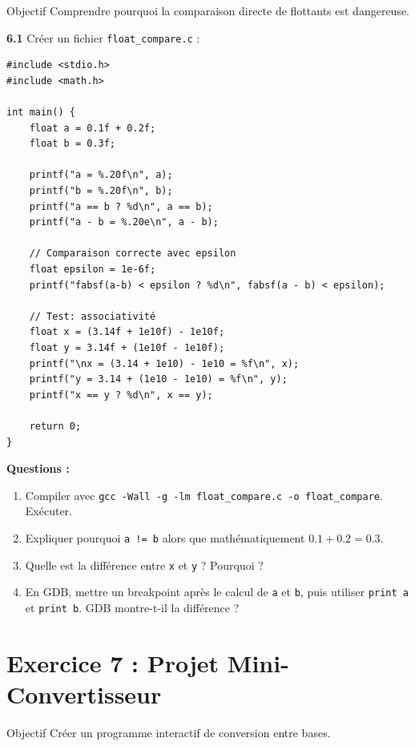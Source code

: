 \documentclass[10pt,a4paper]{article}
\begin{document}
\begin{exercicebox}{Objectif}
Comprendre pourquoi la comparaison directe de flottants est dangereuse.
\end{exercicebox}

\textbf{6.1} Créer un fichier \texttt{float\_compare.c} :

\begin{lstlisting}
#include <stdio.h>
#include <math.h>

int main() {
    float a = 0.1f + 0.2f;
    float b = 0.3f;
    
    printf("a = %.20f\n", a);
    printf("b = %.20f\n", b);
    printf("a == b ? %d\n", a == b);
    printf("a - b = %.20e\n", a - b);
    
    // Comparaison correcte avec epsilon
    float epsilon = 1e-6f;
    printf("fabsf(a-b) < epsilon ? %d\n", fabsf(a - b) < epsilon);
    
    // Test: associativité
    float x = (3.14f + 1e10f) - 1e10f;
    float y = 3.14f + (1e10f - 1e10f);
    printf("\nx = (3.14 + 1e10) - 1e10 = %f\n", x);
    printf("y = 3.14 + (1e10 - 1e10) = %f\n", y);
    printf("x == y ? %d\n", x == y);
    
    return 0;
}
\end{lstlisting}

\textbf{Questions :}
\begin{enumerate}[label=\alph*)]
    \item Compiler avec \texttt{gcc -Wall -g -lm float\_compare.c -o float\_compare}. Exécuter.
    \item Expliquer pourquoi \texttt{a != b} alors que mathématiquement $0.1 + 0.2 = 0.3$.
    \item Quelle est la différence entre \texttt{x} et \texttt{y} ? Pourquoi ?
    \item En GDB, mettre un breakpoint après le calcul de \texttt{a} et \texttt{b}, puis utiliser \texttt{print a} et \texttt{print b}. GDB montre-t-il la différence ?
\end{enumerate}

\section{Exercice 7 : Projet Mini-Convertisseur}

\begin{exercicebox}{Objectif}
Créer un programme interactif de conversion entre bases.
\end{exercicebox}
\end{document}
